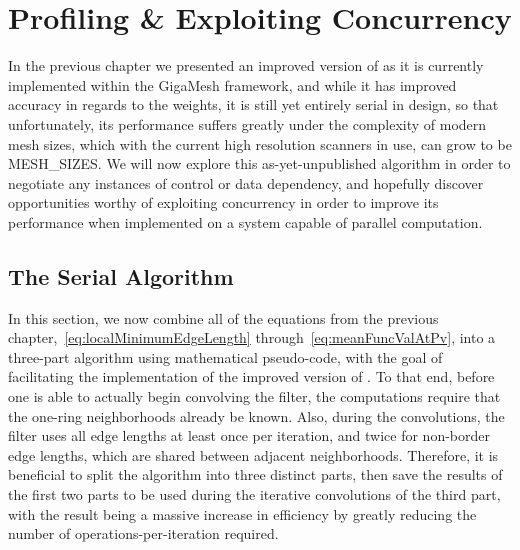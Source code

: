 \chapter{Profiling \& Exploiting Concurrency}
\label{ch5}
In the previous chapter we presented an improved version of  as it is currently implemented within the GigaMesh framework, and while it has improved accuracy in regards to the weights, it is still yet entirely serial in design, so that unfortunately, its performance suffers greatly under the complexity of modern mesh sizes, which with the current high resolution scanners in use, can grow to be MESH\_SIZES. We will now explore this as-yet-unpublished algorithm in order to negotiate any instances of control or data dependency, and hopefully discover opportunities worthy of exploiting concurrency in order to improve its performance when implemented on a system capable of parallel computation.

%
%
%
%
\section{The Serial Algorithm}
\label{ch5sSI}
In this section, we now combine all of the equations from the previous chapter,~\ref{eq:localMinimumEdgeLength} through~\ref{eq:meanFuncValAtPv}, into a three-part algorithm using mathematical pseudo-code, with the goal of facilitating the implementation of the improved version of . To that end, before one is able to actually begin convolving the filter, the computations require that the one-ring neighborhoods already be known. Also, during the convolutions, the filter uses all edge lengths at least once per iteration, and twice for non-border edge lengths, which are shared between adjacent neighborhoods. Therefore, it is beneficial to split the algorithm into three distinct parts, then save the results of the first two parts to be used during the iterative convolutions of the third part, with the result being a massive increase in efficiency by greatly reducing the number of operations-per-iteration required.

%
%
